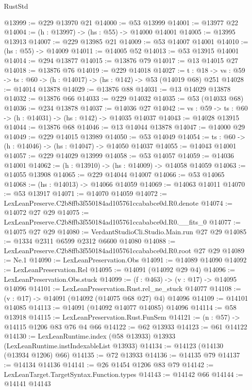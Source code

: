 \begin{lexlean}{RustStd}
\begin{coremodule}
@13999 := @229 @13970 @21
@14000 := @53 @13999
@14001 := @13977 @22
@14004 := (h : @13997) -> (hs : @55) -> @14000 @14001
@14005 := @13995 @13913
@14007 := @229 @13985 @21
@14009 := @53 @14007 @14001
@14010 := (hs : @55) -> @14009
@14011 := @14005 @52
@14013 := @53 @13915 @14001
@14014 := @294 @13877
@14015 := @13876 @79
@14017 := @13 @14015 @27
@14018 := @13876 @76
@14019 := @229 @14018
@14027 := {t : @18} ->
  {vs : @59} -> {ts : @60} -> (h : @14017) -> (hs : @142) -> @53 (@14019 @68) @251
@14028 := @14014 @13878
@14029 := @13876 @88
@14031 := @13 @14029 @13878
@14032 := @13876 @66
@14033 := @229 @14032
@14035 := @53 (@14033 @68)
@14036 := @234 @13878
@14037 := @14036 @27
@14042 := {vs : @59} -> {ts : @60} -> (h : @14031) -> (hs : @142) -> @14035 @14037
@14043 := @14028 @13915
@14044 := @13876 @68
@14046 := @13 @14044 @13878
@14047 := @14000 @29
@14049 := @229 @14015 @13989
@14050 := @53 @14049
@14054 := {ts : @60} -> (h : @14046) -> (hs : @14047) -> @14050 @14037
@14055 := @14043 @14001
@14057 := @229 @14029 @13999
@14058 := @53 @14057
@14059 := @14036 @14001
@14062 := (h : @13910) -> (hs : @14009) -> @14058 @14059
@14063 := @14055 @13908
@14065 := @229 @14044 @14007
@14066 := @53 @14065
@14068 := (hs : @14013) -> @14066 @14059
@14069 := @14063 @14011
@14070 := @53 @13917
@14071 := @14070 @14059
@14072 := LexLeanPreserve.C2b8ffb3f550184ad105761ccababce0d.R0.denote
@14074 := @14072 @27 @29
@14075 := LexLeanPreserve.C2b8ffb3f550184ad105761ccababce0d.R0.__fits_0
@14077 := @14075 @27 @29
@14080 := VerdantStudioCli.Studio.Main.run @27 @29
@14085 := @1334 @2311 @6599 @2312 @6600 @14080
@14088 := LexLeanPreserve.C2b8ffb3f550184ad105761ccababce0d.R0.root @27 @29
@14089 := Ne.{1}
@14090 := LexLeanPreservation.Obs
@14091 := @14089 @14090
@14092 := LexLeanPreservation.Rel
@14095 := @14091 (@14092 @29 @4)
@14096 := LexLeanPreservation.Obs.stuck
@14099 := (f : @463) -> (v : @17) -> @14095 @14096
@14101 := LexLeanPreservation.Rust.rel_ne_stuck @14077
@14108 := (v : @17) -> @14091 (@14092 (@14075 @68 @27) @4) @14096
@14109 := @14101 @14085
@14113 := @14091 (@14092 @14077 @14085) @14096
@14114 := @58 @13918
@14115 := LexLeanPreservation.Rust.FunSem
@14121 := (n : @57) -> @14115 @1206 @83 @76 @4 @66
@14122 := @62 @13933
@14123 := @61 @14122
@14130 := LexLeanRuntime.index (@58 @13933) @13933 (LexLeanRuntime.instIndexableList @13933)
@14134 := @14123 (@14130 (@13934 @1206) @66)
@14135 := @72 @13933
@14136 := @14135 @79
@14137 := @14134 @14136
@14141 := @26 @1454 @1206 @83 @79
@14142 := LexLeanTarget.TargetSyntax.Function.types
@14143 := @14142 @66
@14144 := @14141 @14143

\end{coremodule}
\end{lexlean}
